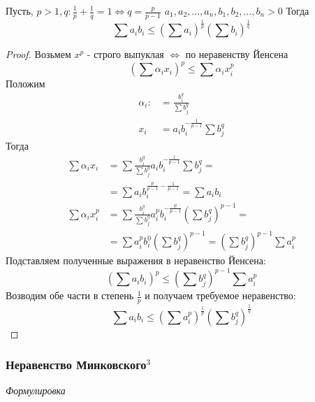 \documentclass{article}
\begin{document}
Пусть, $p > 1, q: \frac{1} {p} + \frac{1} {q} = 1 \Leftrightarrow q = \frac{p} {p - 1}$
$a_1, a_2, \dots, a_n, b_1, b_2, \dots, b_n > 0$
Тогда
\begin{equation*}
\sum a_i b_i \leq \left(\sum a_i\right)^\frac{1}{p} \left(\sum b_i\right)^\frac{1} {q}
\end{equation*}
\begin{proof}
Возьмем $x^p$ - строго выпуклая $\Leftrightarrow$ по неравенству Йенсена 
\begin{equation*}
\left(\sum \alpha_i x_i\right)^p \leq \sum \alpha_i x_i^p
\end{equation*}
Положим
\begin{align*}
\alpha_i :&= \frac{b_i^q} {\sum b_j^q}\\
x_i &= a_i b_i^{-\frac {1} {p - 1}} \sum b_j^q
\end{align*}
Тогда 
\begin{align*}
\sum \alpha_i x_i &= \sum \frac{b_i^q} {\sum b_j^q} a_i b_i^{-\frac {1} {p - 1}} \sum b_j^q = \\
&= \sum a_i b_i^{\frac{p} {p - 1} - \frac{1} {p - 1}} = \sum a_i b_i\\
\sum \alpha_i x_i^p &= \sum \frac{b_i^q} {\sum{b_j^q}} a_i^p b_i^{-\frac{p} {p - 1}}\left( \sum b_j^q\right) ^{p - 1} = \\
&= \sum a_i^p b_i^0 \left(\sum b_j^q\right)^{p - 1} = \left(\sum b_j^q\right)^{p - 1} \sum a_i^p
\end{align*}
Подставляем полученные выражения в неравенство Йенсена:
\begin{equation*}
\left(\sum a_i b_i\right)^p \leq \left(\sum b_j^q\right)^{p - 1} \sum a_i^p
\end{equation*}
Возводим обе части в степень $\frac{1} {p}$ и получаем требуемое неравенство:
\begin{equation*}
\sum a_i b_i \leq \left(\sum a_i^p\right)^\frac{1} {p} \left(\sum b_j^q\right)^\frac{1} {q}
\end{equation*}
\end{proof}

\subsubsection{Неравенство Минковского\texorpdfstring{$^3$}{}}
\textit{Формулировка}
\end{document}
